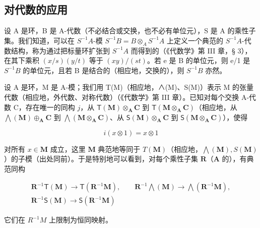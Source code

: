 \subsection{对代数的应用}

设 A 是环，B 是 A-代数（不必结合或交换，也不必有单位元），S 是 A 的乘性子集。我们知道，可以在 \(S^{-1}A\)-模 \(S^{-1}B = B \otimes_{A} S^{-1}A\) 上定义一个典范的 \(S^{-1}A\)-代数结构，称为通过把标量环扩张到 \(S^{-1}A\) 而得到的（《代数学》第 III 章，§ 3），在其下乘积 \((x/s)(y/t)\) 等于 \((xy)/(st)\)。若 e 是 B 的单位元，则 e/1 是 \(S^{-1}B\) 的单位元，且若 B 是结合的（相应地，交换的），则 \(S^{-1}B\) 亦然。

设 A 是环，M 是 A-模；我们用 T(M)（相应地，∧(M)、S(M)）表示 M 的张量代数（相应地，外代数、对称代数）（《代数学》第 III 章）。已知对每个交换 A-代数 C，存在唯一的同构 \(j\)，从 \(\mathsf{T}(\mathbf{M}) \otimes_{\mathbf{A}} \mathbf{C}\) 到 \(\mathsf{T}(\mathbf{M} \otimes_{\mathbf{A}} \mathbf{C})\)（相应地，从 \(\bigwedge (\mathbf{M}) \oplus_{\mathbf{A}} \mathbf{C}\) 到 \(\bigwedge (\mathbf{M} \otimes_{\mathbf{A}} \mathbf{C})\)、从 \(\mathsf{S}(\mathbf{M}) \otimes_{\mathbf{A}} \mathbf{C}\) 到 \(\mathsf{S}(\mathbf{M} \otimes_{\mathbf{A}} \mathbf{C})\)），使得

\[
i (x \otimes 1) = x \otimes 1
\]

对所有 \(x \in \mathbf{M}\) 成立，这里 \(\mathbf{M}\) 典范地等同于 \(T(\mathbf{M})\)（相应地，\(\bigwedge (\mathbf{M}), S(\mathbf{M})\)）的子模（出处同前）。于是特别地可以看到，对每个乘性子集 \(\mathbf{R}\)（\(\mathbf{A}\) 的），有典范同构

\[
\begin{array}{c} \mathbf {R} ^ {- 1} \mathsf {T} (\mathbf {M}) \to \mathsf {T} (\mathbf {R} ^ {- 1} \mathbf {M}), \qquad \mathbf {R} ^ {- 1} \bigwedge (\mathbf {M}) \to \bigwedge (\mathbf {R} ^ {- 1} \mathbf {M}), \\ \mathbf {R} ^ {- 1} \mathsf {S} (\mathbf {M}) \to \mathsf {S} (\mathbf {R} ^ {- 1} \mathbf {M}) \end{array}
\]

它们在 \(R^{-1}M\) 上限制为恒同映射。

